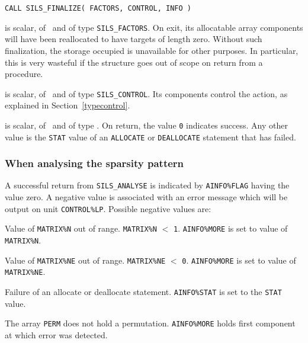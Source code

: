 \documentclass{galahad}
\newcommand{\packagename}{SILS}
\begin{document}
\hskip0.5in 
{\tt CALL \packagename\_FINALIZE( FACTORS, CONTROL, INFO )}

\begin{description}
 is scalar, of \intentinout\ and of type 
{\tt \packagename\_FACTORS}. On exit, its allocatable array components will have 
been reallocated to have targets of length zero.  Without such 
finalization, the storage occupied is unavailable for other purposes. 
In particular, this is very wasteful if the structure goes out of scope 
on return from a procedure. 
 
 is scalar, of \intentin\ and of type {\tt \packagename\_CONTROL}.
Its components control the action, as explained in Section~\ref{typecontrol}. 
 
 is scalar, of \intentout\, and of type \integer.  On return, 
the value {\tt 0} indicates success. Any other value is the {\tt STAT} value of 
an {\tt ALLOCATE} or {\tt DEALLOCATE} statement that has failed. 

\end{description}


\galerrors
\subsubsection{When analysing the sparsity pattern}\label{erroranal}
A successful return from {\tt \packagename\_ANALYSE} is indicated by 
 {\tt AINFO\%FLAG} having the value zero.  A negative value is 
 associated with an error message which will  be output on unit 
 {\tt CONTROL\%LP}. Possible negative values are:  
 
\begin{description} 
 Value of {\tt MATRIX\%N} out of range.  {\tt MATRIX\%N} $<$ {\tt 1}. 
{\tt AINFO\%MORE} is set to value of {\tt MATRIX\%N}. 
 
 Value of {\tt MATRIX\%NE} out of range.  {\tt MATRIX\%NE} $<$ {\tt 0}. 
{\tt AINFO\%MORE} is set to value of {\tt MATRIX\%NE}. 
 
 Failure of an allocate or deallocate statement. {\tt AINFO\%STAT} 
 is set to the {\tt STAT} value. 
 
 The array {\tt PERM} does not hold a permutation. 
{\tt AINFO\%MORE} holds first component at which error was detected. 
 
\end{description} 
\end{document}
